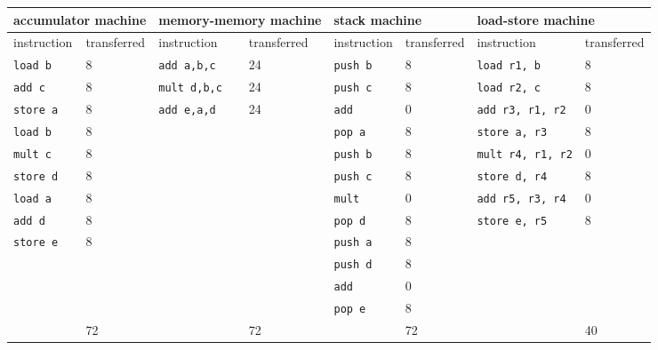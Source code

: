 \documentclass{article}
\begin{document}
\begin{tabular}{l|ll|ll|ll|l|}
\hline
\multicolumn{2}{|l|}{accumulator machine} & \multicolumn{2}{|l|}{memory-memory machine} & \multicolumn{2}{|l|}{stack machine} & \multicolumn{2}{|l|}{load-store machine} \\ \hline
\multicolumn{1}{|l|}{instruction} & transferred & \multicolumn{1}{|l|}{instruction} & transferred & \multicolumn{1}{|l|}{instruction} & transferred & \multicolumn{1}{|l|}{instruction} & transferred \\ \hline
\multicolumn{1}{|l|}{\texttt{load b}} & 8 & \multicolumn{1}{|l|}{\texttt{add a,b,c}} & 24 & \multicolumn{1}{|l|}{\texttt{push b}} & 8 &\multicolumn{1}{|l|}{\texttt{load r1, b}} & 8 \\ 
\multicolumn{1}{|l|}{\texttt{add c}} & 8 &\multicolumn{1}{|l|}{\texttt{mult d,b,c}} & 24 & \multicolumn{1}{|l|}{\texttt{push c}} & 8 & \multicolumn{1}{|l|}{\texttt{load r2, c}} & 8 \\
\multicolumn{1}{|l|}{\texttt{store a}} & 8 & \multicolumn{1}{|l|}{\texttt{add e,a,d}} & 24 & \multicolumn{1}{|l|}{\texttt{add}} & 0 & \multicolumn{1}{|l|}{\texttt{add r3, r1, r2}} & 0\\
\multicolumn{1}{|l|}{\texttt{load b}} & 8 & \multicolumn{1}{|l|}{} & & \multicolumn{1}{|l|}{\texttt{pop a}} & 8 & \multicolumn{1}{|l|}{\texttt{store a, r3}} & 8\\
\multicolumn{1}{|l|}{\texttt{mult c}} & 8 & \multicolumn{1}{|l|}{} & & \multicolumn{1}{|l|}{\texttt{push b}} & 8 & \multicolumn{1}{|l|}{\texttt{mult r4, r1, r2}} & 0 \\
\multicolumn{1}{|l|}{\texttt{store d}} & 8 & \multicolumn{1}{|l|}{} & &\multicolumn{1}{|l|}{\texttt{push c}} & 8 & \multicolumn{1}{|l|}{\texttt{store d, r4}} & 8\\ 
\multicolumn{1}{|l|}{\texttt{load a}} & 8 & \multicolumn{1}{|l|}{} & & \multicolumn{1}{|l|}{\texttt{mult}} & 0 & \multicolumn{1}{|l|}{\texttt{add r5, r3, r4}} & 0 \\
\multicolumn{1}{|l|}{\texttt{add d}} & 8 & \multicolumn{1}{|l|}{} & & \multicolumn{1}{|l|}{\texttt{pop d}} & 8 & \multicolumn{1}{|l|}{\texttt{store e, r5}} & 8\\
\multicolumn{1}{|l|}{\texttt{store e}} & 8 & \multicolumn{1}{|l|}{} & & \multicolumn{1}{|l|}{\texttt{push a}} & 8 & \multicolumn{1}{|l|}{} & \\
\multicolumn{1}{|l|}{} & & \multicolumn{1}{|l|}{} & & \multicolumn{1}{|l|}{\texttt{push d}} & 8 & \multicolumn{1}{|l|}{} & \\ 
\multicolumn{1}{|l|}{} & & \multicolumn{1}{|l|}{} & & \multicolumn{1}{|l|}{\texttt{add}} & 0 & \multicolumn{1}{|l|}{} &\\
\multicolumn{1}{|l|}{} & & \multicolumn{1}{|l|}{} & & \multicolumn{1}{|l|}{\texttt{pop e}} & 8 & \multicolumn{1}{|l|}{} &\\
\hline
 & \multicolumn{1}{|l|}{72} & & \multicolumn{1}{|l|}{72} & & \multicolumn{1}{|l|}{72} & & \multicolumn{1}{|l|}{40} \\
 \cline{2-2}\cline{4-4}\cline{6-6}\cline{8-8}
\end{tabular}
\end{document}
